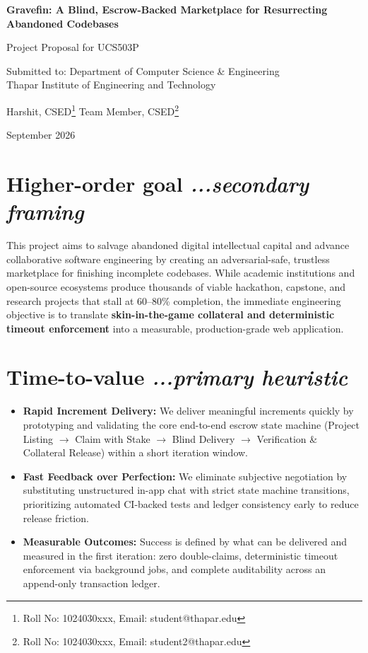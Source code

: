 \documentclass[11pt,a4paper]{article}
\begin{document}
\begin{center}
    {\LARGE \textbf{Gravefin: A Blind, Escrow-Backed Marketplace for Resurrecting Abandoned Codebases}\par}
    \vspace{0.7em}
    {\large Project Proposal for UCS503P\par}
    \vspace{0.4em}
    Submitted to: Department of Computer Science \& Engineering\\
    Thapar Institute of Engineering and Technology\par
    \vspace{1em}
    Harshit, CSED\footnote{Roll No: 1024030xxx, Email: student@thapar.edu} \qquad Team Member, CSED\footnote{Roll No: 1024030xxx, Email: student2@thapar.edu}\par
    \vspace{0.7em}
    September 2026
\end{center}

\vspace{0.5em}

\section{Higher-order goal \hfill \normalfont\small\textit{...secondary framing}}
This project aims to salvage abandoned digital intellectual capital and advance collaborative software engineering by creating an adversarial-safe, trustless marketplace for finishing incomplete codebases. While academic institutions and open-source ecosystems produce thousands of viable hackathon, capstone, and research projects that stall at 60--80\% completion, the immediate engineering objective is to translate \textbf{skin-in-the-game collateral and deterministic timeout enforcement} into a measurable, production-grade web application.

\section{Time-to-value \hfill \normalfont\small\textit{...primary heuristic}}
\begin{itemize}
    \item \textbf{Rapid Increment Delivery:} We deliver meaningful increments quickly by prototyping and validating the core end-to-end escrow state machine (Project Listing $\rightarrow$ Claim with Stake $\rightarrow$ Blind Delivery $\rightarrow$ Verification \& Collateral Release) within a short iteration window.
    \item \textbf{Fast Feedback over Perfection:} We eliminate subjective negotiation by substituting unstructured in-app chat with strict state machine transitions, prioritizing automated CI-backed tests and ledger consistency early to reduce release friction.
    \item \textbf{Measurable Outcomes:} Success is defined by what can be delivered and measured in the first iteration: zero double-claims, deterministic timeout enforcement via background jobs, and complete auditability across an append-only transaction ledger.
\end{itemize}
\end{document}
